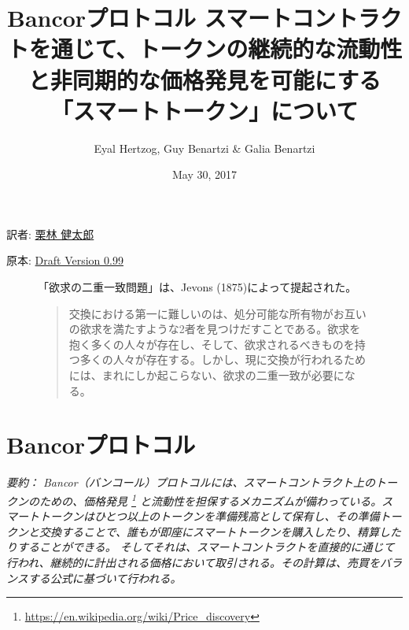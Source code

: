 \documentclass{jsarticle}
\begin{document}
\title{
  \textbf{Bancorプロトコル}
  \protect\linebreak
  \protect\linebreak
  \large
  スマートコントラクトを通じて、トークンの継続的な流動性と非同期的な価格発見を可能にする「スマートトークン」について
}

\author{Eyal Hertzog, Guy Benartzi \& Galia Benartzi}
\date{May 30, 2017}

\maketitle

\begin{center}
  \item[訳者:] \href{https://kentarok.org}{栗林 健太郎}
  \item[原本:] \href{http://www.hyuki.com/girl/}{Draft Version 0.99}
\end{center}

\begin{figure}[b]
  「欲求の二重一致問題」は、Jevons (1875)によって提起された。

  \begin{quotation}  
    交換における第一に難しいのは、処分可能な所有物がお互いの欲求を満たすような2者を見つけだすことである。欲求を抱く多くの人々が存在し、そして、欲求されるべきものを持つ多くの人々が存在する。しかし、現に交換が行われるためには、まれにしか起こらない、欲求の二重一致が必要になる。
  \end{quotation}
\end{figure}

\newpage
\setcounter{tocdepth}{3}
\tableofcontents
\newpage

\section{Bancorプロトコル}

\emph{
  要約： Bancor（バンコール）プロトコルには、スマートコントラクト上のトークンのための、価格発見
  \footnote{\url{https://en.wikipedia.org/wiki/Price_discovery}}
  と流動性を担保するメカニズムが備わっている。スマートトークンはひとつ以上のトークンを準備残高として保有し、その準備トークンと交換することで、誰もが即座にスマートトークンを購入したり、精算したりすることができる。 そしてそれは、スマートコントラクトを直接的に通じて行われ、継続的に計出される価格において取引される。その計算は、売買をバランスする公式に基づいて行われる。
} \\
\end{document}
